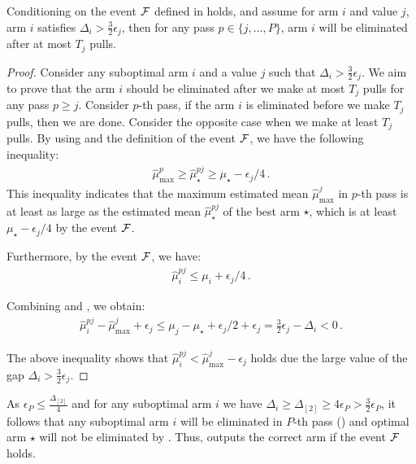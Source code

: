 \begin{lemma}\label{lem:improved-suboptimal-bound}    
	Conditioning on the event \(\mathcal{F}\) defined in  holds, and assume for arm \(i\) and value \(j\), arm \(i\) satisfies \(\Delta_i > \frac{3}{2}\epsilon_j\), then for any pass \(p \in \{j, \dotsc, P\}\), arm \(i\) will be eliminated after at most \(T_j\) pulls.
\end{lemma}
\begin{proof}
	Consider any suboptimal arm \(i\) and a value \(j\) such that \(\Delta_i > \frac{3}{2} \epsilon_j\). We aim to prove that the arm \(i\) should be eliminated after we make at most \(T_j\) pulls for any pass \(p \geq j\). Consider \(p\)-th pass, if the arm \(i\) is eliminated before we make \(T_j\) pulls, then we are done. 
	Consider the opposite case when we make at least \(T_j\) pulls. By using  and the definition of the event \(\mathcal{F}\), we have the following inequality: 
	\begin{align}\label{eq:improved-best-lower}
		\hat\mu^{p}_{\max} \ge \hat\mu^{pj}_{\star} \ge \mu_{\star} - \epsilon_j / 4\,.
	\end{align}
	This inequality indicates that the maximum estimated mean \(\hat\mu^{j}_{\max}\) in \(p\)-th pass is at least as large as the estimated mean \(\hat\mu^{pj}_{\star}\) of the best arm \(\star\), which is at least \(\mu_\star - \epsilon_j / 4\) by the event \(\mathcal{F}\). 
	
	Furthermore, by the event \(\mathcal{F}\), we have:
	\begin{align}\label{eq:improved-sub-upper}
		\hat\mu^{pj}_{i} \le \mu_i + \epsilon_j / 4\,.
	\end{align}
	
	Combining  and , we obtain: 
	\begin{align*}
		\hat\mu^{pj}_i - \hat\mu^j_{\max} + \epsilon_j \leq \mu_j - \mu_\star + \epsilon_j / 2 + \epsilon_j = \frac{3}{2}\epsilon_j - \Delta_i < 0\,.
	\end{align*}
	
	The above inequality shows that \(\hat\mu^{pj}_i < \hat\mu^{j}_{\max} - \epsilon_j\) holds due the large value of the gap \(\Delta_i > \frac{3}{2} \epsilon_j\). 
\end{proof}

As \(\epsilon_P \le \frac{\Delta_{[2]}}{4}\) and for any suboptimal arm \(i\) we have \(\Delta_i \ge \Delta_{[2]} \ge 4\epsilon_P > \frac{3}{2}\epsilon_P\), it follows that any suboptimal arm \(i\) will be eliminated in \(P\)-th pass () and optimal arm \(\star\) will not be eliminated by . Thus,  outputs the correct arm if the event \(\mathcal{F}\) holds.


